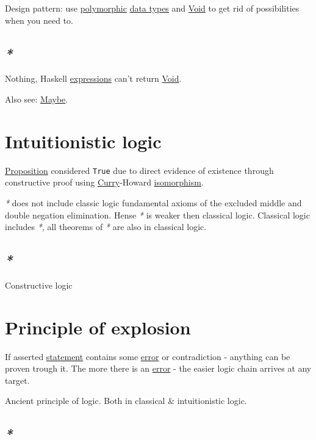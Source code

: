 \documentclass[a4paper,14pt,oneside]{book}
\begin{document}
Design pattern: use \hyperref[orgf3f0679]{polymorphic} \hyperref[org38851b8]{data types} and \hyperref[org0cf3916]{Void} to get rid of possibilities when you need to.

\section{\emph{*}}
\label{sec:org45520db}
\label{orge6642dc}Nothing, Haskell \hyperref[orge290aad]{expressions} can't return \hyperref[org0cf3916]{Void}.

Also see: \hyperref[org18d8457]{Maybe}.

\chapter{Intuitionistic logic}
\label{sec:org49d510c}

\hyperref[org9e8175f]{Proposition} considered \texttt{True} due to direct evidence of existence through constructive proof using \hyperref[orgd465e1e]{Curry}-Howard \hyperref[org75398b2]{isomorphism}.

\emph{*} does not include classic logic fundamental axioms of the excluded middle and double negation elimination. Hense \emph{*} is weaker then classical logic. Classical logic includes \emph{*}, all theorems of \emph{*} are also in classical logic.

\section{\emph{*}}
\label{sec:orgd7bdbd6}

\label{org8ce1f8d}Constructive logic

\chapter{\label{orgb043081}Principle of explosion}
\label{sec:orgac5fd0e}
If asserted \hyperref[org107a1e7]{statement} contains some \hyperref[orgbd3bda1]{error} or contradiction - anything can be proven trough it.
The more there is an \hyperref[orgbd3bda1]{error} - the easier logic chain arrives at any target.

Ancient principle of logic. Both in classical \& intuitionistic logic.

\section{\emph{*}}
\label{sec:orgd14ee19}
\end{document}
